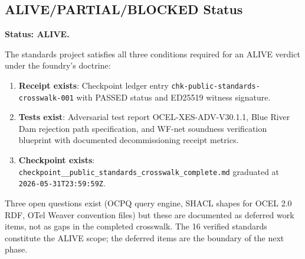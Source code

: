 \subsection{ALIVE/PARTIAL/BLOCKED Status}
\label{sec:standards-evidence-status}

\textbf{Status: ALIVE.}

The standards project satisfies all three conditions required for an ALIVE verdict under
the foundry's doctrine:

\begin{enumerate}
  \item \textbf{Receipt exists}: Checkpoint ledger entry \texttt{chk-public-standards-crosswalk-001}
        with PASSED status and ED25519 witness signature.
  \item \textbf{Tests exist}: Adversarial test report OCEL-XES-ADV-V30.1.1, Blue River Dam
        rejection path specification, and WF-net soundness verification blueprint with
        documented decommissioning receipt metrics.
  \item \textbf{Checkpoint exists}: \texttt{checkpoint\_\_public\_standards\_crosswalk\_complete.md}
        graduated at \texttt{2026-05-31T23:59:59Z}.
\end{enumerate}

Three open questions exist (OCPQ query engine, SHACL shapes for OCEL 2.0 RDF, OTel Weaver
convention files) but these are documented as deferred work items, not as gaps in the
completed crosswalk. The 16 verified standards constitute the ALIVE scope; the deferred
items are the boundary of the next phase.
